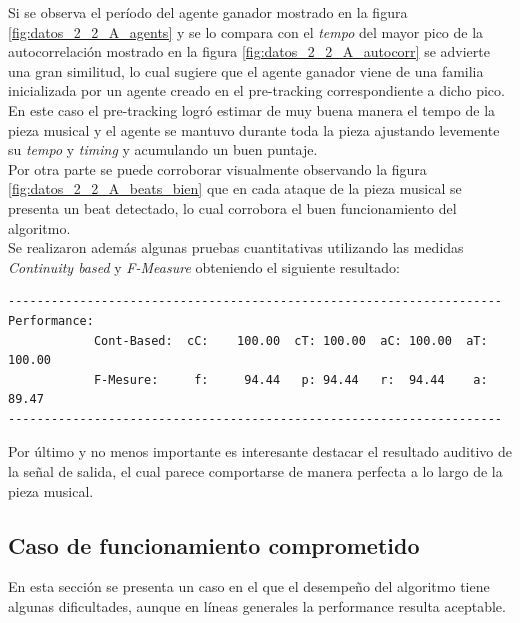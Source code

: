 \documentclass[12pt,a4paper,titlepage]{report}
\begin{document}
Si se observa el período del agente ganador mostrado en la figura \ref{fig:datos_2_2_A_agents} y se lo compara con el \emph{tempo} del mayor pico de la autocorrelación mostrado en la figura \ref{fig:datos_2_2_A_autocorr} se advierte una gran similitud, lo cual sugiere que el agente ganador viene de una familia inicializada por un agente creado en el pre-tracking correspondiente a dicho pico. En este caso el pre-tracking logró estimar de muy buena manera el tempo de la pieza musical y el agente se mantuvo durante toda la pieza ajustando levemente su \emph{tempo} y \emph{timing} y acumulando un buen puntaje.\\

Por otra parte se puede corroborar visualmente observando la figura \ref{fig:datos_2_2_A_beats_bien} que en cada ataque de la pieza musical se presenta un beat detectado, lo cual corrobora el buen funcionamiento del algoritmo.\\

Se realizaron además algunas pruebas cuantitativas utilizando las medidas \emph{Continuity based} y \emph{F-Measure} obteniendo el siguiente resultado:

\begin{verbatim}
---------------------------------------------------------------------
Performance:
        	Cont-Based:	 cC:	100.00	cT:	100.00	aC:	100.00	aT:	100.00
        	F-Mesure:     f:	 94.44	 p:	94.44   r:	94.44 	 a:	89.47
---------------------------------------------------------------------
\end{verbatim}

Por último y no menos importante es interesante destacar el resultado auditivo de la señal de salida, el cual parece comportarse de manera perfecta a lo largo de la pieza musical.


\subsection{Caso de funcionamiento comprometido}
\label{sec:andamal}

En esta sección se presenta un caso en el que el desempeño del algoritmo tiene algunas dificultades, aunque en líneas generales la performance resulta aceptable.\\
\end{document}
